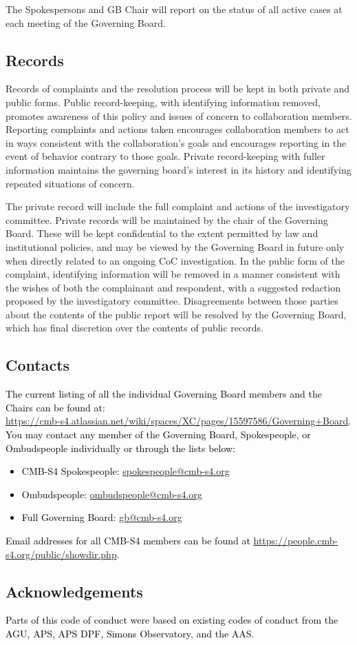 \documentclass[12pt]{article}
\newcommand{\todo}[1]{\textcolor{red}{(TODO: #1)}}
\newcommand{\rev}[1]{\textcolor{black}{#1}}
\begin{document}
The Spokespersons and GB Chair will report on the status of all active cases at each meeting of the Governing Board.

\subsection{Records}

Records of complaints and the resolution process will be kept in both private and public forms. Public record-keeping, with identifying information removed, promotes awareness of this policy and issues of concern to collaboration members. Reporting complaints and actions taken encourages collaboration members to act in ways consistent with the collaboration's goals and encourages reporting in the event of behavior contrary to those goals. Private record-keeping with fuller information maintains the governing board's interest in its history and identifying repeated situations of concern.

The private record will include the full complaint and actions of the investigatory committee. Private records will be maintained by the chair of the Governing Board. These will be kept confidential to the extent permitted by law and institutional policies, and may be viewed by the Governing Board in future only when directly related to an ongoing CoC investigation. In the public form of the complaint, identifying information will be removed in a manner consistent with the wishes of both the complainant and respondent, with a suggested redaction proposed by the investigatory committee. Disagreements between those parties about the contents of the public report will be resolved by the Governing Board, which has final discretion over the contents of public records.


\subsection{Contacts}\label{sec:contacts}
\rev{The current listing of all the individual Governing Board members and the Chairs can be found at:\\
\url{https://cmb-s4.atlassian.net/wiki/spaces/XC/pages/15597586/Governing+Board}.\\
You may contact any member of the Governing Board, Spokespeople, or Ombudspeople individually or through the lists below:\\
\begin{itemize}
    \item CMB-S4 Spokespeople: \url{spokespeople@cmb-s4.org}
    \item Ombudspeople: \url{ombudspeople@cmb-s4.org}
    \item Full Governing Board: \url{gb@cmb-s4.org}
\end{itemize}}
\rev{Email addresses for all CMB-S4 members can be found at \url{https://people.cmb-s4.org/public/showdir.php}.}

\subsection{Acknowledgements}
\rev{Parts of this code of conduct were based on existing codes of conduct from the AGU, APS, APS DPF, Simons Observatory, and the AAS.} %
\end{document}

